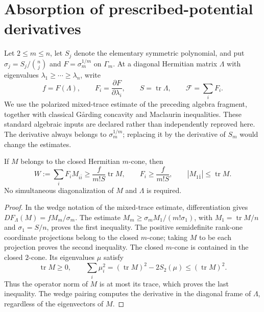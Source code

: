 \section{Absorption of prescribed-potential derivatives}

Let $2\leq m\leq n$, let $S_j$ denote the elementary symmetric polynomial, and put $\sigma_j=S_j/\binom nj$ and $F=\sigma_m^{1/m}$ on $\Gamma_m$. At a diagonal Hermitian matrix $\Lambda$ with eigenvalues $\lambda_1\geq\cdots\geq\lambda_n$, write
\[
 f=F(\Lambda),\qquad F_i=\frac{\partial F}{\partial\lambda_i},\qquad
 S=\operatorname{tr}\Lambda,\qquad \mathcal F=\sum_iF_i.
\]
We use the polarized mixed-trace estimate of the preceding algebra fragment, together with classical G\aa rding concavity and Maclaurin inequalities. These standard algebraic inputs are declared rather than independently reproved here. The derivative always belongs to $\sigma_m^{1/m}$; replacing it by the derivative of $S_m$ would change the estimates.

\begin{lemma}\label{draft:599-weighted-cone-trace}
If $M$ belongs to the closed Hermitian $m$-cone, then
\[
 W:=\sum_iF_iM_{i\bar i}\geq\frac{f}{m!S}\operatorname{tr}M,
 \qquad F_i\geq\frac{f}{m!S},\qquad
 |M_{1\bar1}|\leq\operatorname{tr}M.
\]
No simultaneous diagonalization of $M$ and $\Lambda$ is required.
\end{lemma}
\begin{proof}
In the wedge notation of the mixed-trace estimate, differentiation gives $DF_\Lambda(M)=fM_m/\sigma_m$. The estimate $M_m\geq\sigma_m M_1/(m!\sigma_1)$, with $M_1=\operatorname{tr}M/n$ and $\sigma_1=S/n$, proves the first inequality. The positive semidefinite rank-one coordinate projections belong to the closed $m$-cone; taking $M$ to be each projection proves the second inequality.
The closed $m$-cone is contained in the closed $2$-cone. Its eigenvalues $\mu$ satisfy
\[
 \operatorname{tr}M\geq0,\qquad
 \sum_i\mu_i^2=(\operatorname{tr}M)^2-2S_2(\mu)
                   \leq(\operatorname{tr}M)^2.
\]
Thus the operator norm of $M$ is at most its trace, which proves the last inequality. The wedge pairing computes the derivative in the diagonal frame of $\Lambda$, regardless of the eigenvectors of $M$.
\end{proof}

